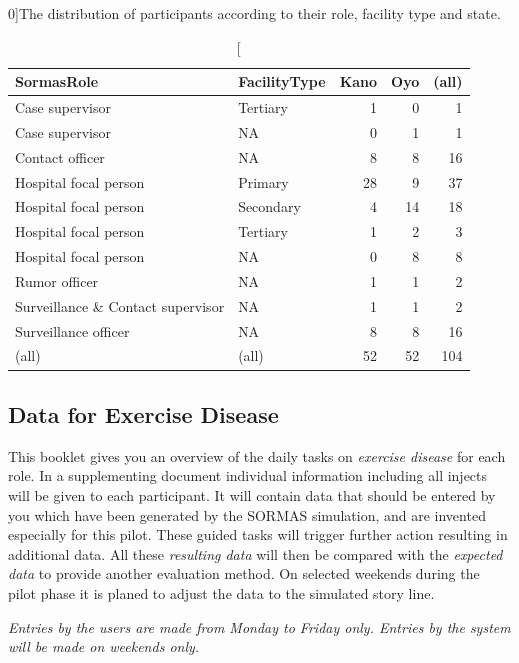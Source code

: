 \documentclass[a4paper, titlepage]{tufte-handout}
\begin{document}
\begin{table}[htb]
\caption[The distribution of roles][0\baselineskip]{The distribution of participants according to their role, facility type and state.}\label{tab:roles}
\begin{tabular}{ll|rr|r}
\toprule
SormasRole & FacilityType & Kano & Oyo & (all)\\
\midrule
Case supervisor & Tertiary & 1 & 0 & 1\\
Case supervisor & NA & 0 & 1 & 1\\
Contact officer & NA & 8 & 8 & 16\\
Hospital focal person & Primary & 28 & 9 & 37\\
Hospital focal person & Secondary & 4 & 14 & 18\\
Hospital focal person & Tertiary & 1 & 2 & 3\\
Hospital focal person & NA & 0 & 8 & 8\\
Rumor officer & NA & 1 & 1 & 2\\
Surveillance \& Contact supervisor & NA & 1 & 1 & 2\\
Surveillance officer & NA & 8 & 8 & 16\\
(all) & (all) & 52 & 52 & 104\\
\bottomrule
\end{tabular}
\end{table}

\medskip

\subsection{Data for Exercise Disease}
\label{sec-1-4}

This booklet gives you an overview of the daily tasks on \emph{exercise disease} for each role. In a supplementing document individual information including all injects will be given to each participant. It will contain data that should be entered by you which have been generated by the SORMAS simulation, and are invented especially for this pilot. These guided tasks will trigger further action resulting in additional data. All these \emph{resulting data} will then be compared with the \emph{expected data} to provide another evaluation method. On selected weekends during the pilot phase it is planed to adjust the data to the simulated story line. 

\emph{Entries by the users are made from Monday to Friday only. Entries by the system will be made on weekends only.}
\end{document}
